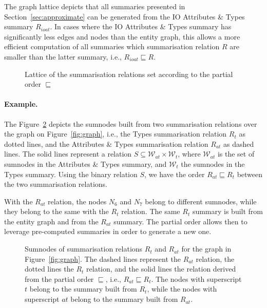 \begin{remark}
The graph lattice depicts that all summaries presented in Section~\ref{sec:approximate} can be generated from the IO Attributes \& Types summary $R_{ioat}$. In cases where the IO Attributes \& Types summary has significantly less edges and nodes than the entity graph, this allows a more efficient computation of all summaries which summarisation relation $R$ are smaller than the latter summary, i.e., $R_{ioat} \sqsubseteq R$.
\end{remark}

\begin{figure}
	\centering
	
	\caption{Lattice of the summarisation relations set according to the partial order $\sqsubseteq$}
	\label{fig:lattice}
\end{figure}

\paragraph{Example.}

The Figure~\ref{fig:rel-order} depicts the sumnodes built from two summarisation relations over the graph on Figure~\ref{fig:graph}, i.e., the Types summarisation relation $R_t$ as dotted lines, and the Attributes \& Types summarisation relation $R_{at}$ as dashed lines. The solid lines represent a relation $S \subseteq \mathcal{W}_{at} \times \mathcal{W}_t$, where $\mathcal{W}_{at}$ is the set of sumnodes in the Attributes \& Types summary, and $\mathcal{W}_{t}$ the sumnodes in the Types summary.
Using the binary relation $S$, we have the order $R_{at} \sqsubseteq R_t$ between the two summarisation relations.

With the $R_{at}$ relation, the nodes $N_6$ and $N_7$ belong to different sumnodes, while they belong to the same with the $R_t$ relation. The same $R_t$ summary is built from the entity graph and from the $R_{at}$ summary. The partial order allows then to leverage pre-computed summaries in order to generate a new one.

\begin{figure}
	\centering
	
	\caption{Sumnodes of summarisation relations $R_t$ and $R_{at}$ for the graph in Figure~\ref{fig:graph}. The dashed lines represent the $R_{at}$ relation, the dotted lines the $R_t$ relation, and the solid lines the relation derived from the partial order $\sqsubseteq$, i.e., $R_{at} \sqsubseteq R_t$. The nodes with superscript $t$ belong to the summary built from $R_t$, while the nodes with superscript $at$ belong to the summary built from $R_{at}$.}
	\label{fig:rel-order}
\end{figure}

